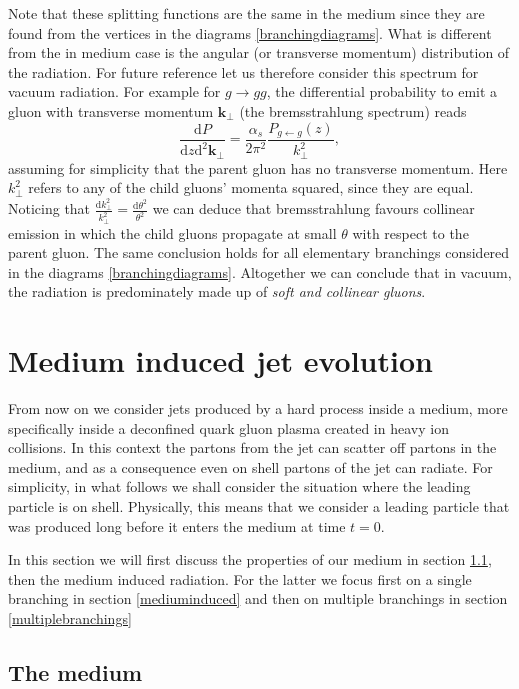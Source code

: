 \documentclass[a4paper,12pt]{article}
\numberwithin{equation}{section}
\begin{document}
Note that these splitting functions are the same in the medium since they are found from the vertices in the diagrams \eqref{branchingdiagrams}. What is different from the in medium case is the angular (or transverse momentum) distribution of the radiation. For future reference let us therefore consider this spectrum for vacuum radiation. For example for $g\rightarrow gg$, the differential probability to emit a gluon with transverse momentum $\mathbf{k}_\perp$ (the bremsstrahlung spectrum) reads
\begin{equation}
\frac{\mathrm{d}P}{\mathrm{d}z\mathrm{d}^2\mathbf{k}_\perp} =\frac{{\alpha_s}}{2\pi^2}\frac{P_{g\leftarrow g}(z)}{k_\perp^2},
\end{equation}
assuming for simplicity that the parent gluon has no transverse momentum. Here $k_\perp^2$ refers to any of the child gluons' momenta squared, since they are equal. Noticing that $\frac{\mathrm{d}k_\perp^2}{k_\perp^2} = \frac{\mathrm{d}\theta^2}{\theta^2}$ we can deduce that bremsstrahlung favours collinear emission in which the child gluons propagate at small $\theta$ with respect to the parent gluon. The same conclusion holds for all elementary branchings considered in the diagrams \eqref{branchingdiagrams}. Altogether we can conclude that in vacuum, the radiation is predominately made up of \emph{soft and collinear gluons}.


\section{Medium induced jet evolution}
From now on we consider jets produced by a hard process inside a medium, more specifically inside a deconfined quark gluon plasma created in heavy ion collisions. In this context the partons from the jet can scatter off partons in the medium, and as a consequence even on shell partons of the jet can radiate. For simplicity, in what follows we shall consider the situation where the leading particle is on shell. Physically, this means that we consider a leading particle that was produced long before it enters the medium at time $t=0$. 

In this section we will first discuss the properties of our medium in section \ref{themedium}, then the medium induced radiation. For the latter we focus first on a single branching in section \ref{mediuminduced} and then on multiple branchings in section \ref{multiplebranchings}

\subsection{The medium}\label{themedium}
\end{document}

